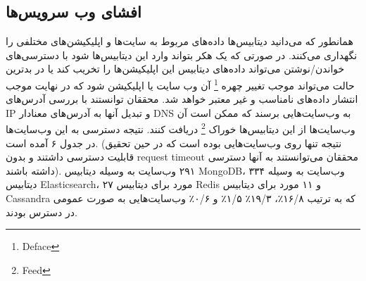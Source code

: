 \documentclass[10pt, a4paper]{article}
\begin{document}
\begin{LTR}
    \begin{table}[h]
        \centering
        \begin{RTL}
            \caption{آنالیز و بررسی پتانسیل نشت پذیری داده‌های حساس کاربران}
        \end{RTL}
    \end{table}
\end{LTR}

\subsection{افشای وب سرویس‌ها}

همانطور که می‌دانید دیتابیس‌ها داده‌های مربوط به سایت‌ها و اپلیکیشن‌های مختلفی
را نگهداری می‌کنند. در صورتی که یک هکر بتواند وارد این دیتابیس‌ها شود با
دسترسی‌های خواندن/نوشتن می‌تواند داده‌های دیتابیس این اپلیکیشن‌ها را تخریب کند
یا در بدترین حالت می‌تواند موجب تغییر چهره \footnote{Deface} آن وب سایت یا
اپلیکیشن شود که در نهایت موجب انتشار داده‌های نامناسب و غیر معتبر خواهد شد.
محققان توانستند با بررسی آدرس‌های IP و تبدیل آنها به آدرس‌های معنادار DNS به
وب‌سایت‌هایی برسند که ممکن است آن وب‌سایت‌ها از این دیتابیس‌ها خوراک
\footnote{Feed} دریافت کنند. نتیجه دسترسی به این وب‌سایت‌ها در جدول ۶ آمده است.
(نتیجه تنها روی وب‌سایت‌هایی بوده است که در حین تحقیق قابلیت دسترسی داشتند و
بدون request timeout محققان می‌توانستند به آنها دسترسی داشته باشند). ۲۹۱ وب‌سایت
به وسیله دیتابیس MongoDB، ۳۳۴ وب‌سایت به وسیله دیتابیس Elasticsearch، ۲۷ مورد
برای دیتابیس Redis و ۱۱ مورد برای دیتابیس Cassandra که به ترتیب ۱۶/۸٪، ۱۹/۳٪
۱/۵٪ و ۰/۶٪ وب‌سایت‌هایی به صورت عمومی در دسترس بودند.
\end{document}
